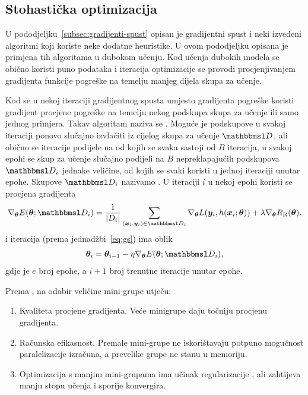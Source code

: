 \documentclass[utf8, diplomski, lmodern]{fer}
\begin{document}
\subsection{Stohastička optimizacija} \label{subsec:dukn-stoh-optimizacija}

U pododjeljku~\ref{subsec:gradijenti-spust} opisan je gradijentni spust i neki izvedeni algoritmi koji koriste neke dodatne heuristike. U ovom pododjeljku opisana je primjena tih algoritama u dubokom učenju. Kod učenja dubokih modela se obično koristi puno podataka i iteracija optimizacije se provodi procjenjivanjem gradijenta funkcije pogreške na temelju manjeg dijela skupa za učenje.

Kod  se u nekoj iteraciji gradijentnog spusta umjesto gradijenta pogreške koristi gradijent procjene pogreške na temelju nekog podskupa skupa za učenje ili samo jednog primjera. Takav algoritam naziva se . Moguće je podskupove u svakoj iteraciji ponovo slučajno izvlačiti iz cijelog skupa za učenje $\set D$, ali obično se iteracije podijele na  od kojih se svaka sastoji od $B$ iteracija, u svakoj epohi se skup za učenje slučajno podijeli na $B$ nepreklapajućih podskupova $\set D_i$ jednake veličine, od kojih se svaki koristi u jednoj iteraciji unutar epohe. Skupove $\set D_i$ nazivamo . U iteraciji $i$ u nekoj epohi koristi se procjena gradijenta
\begin{align} \label{eq:sgs-ucenje}
\nabla_{\vec\theta}E(\vec\theta;\set D_i) = \frac{1}{\envert{D_i}}\sum_{(\vec x_i,\vec y_i)\in\set D_i} \nabla_{\vec\theta}L(\vec y_i,h(\vec x_i;\vec\theta)) + \lambda \nabla_{\vec\theta}R_\text{R}(\vec\theta) \text{.}
\end{align}
i iteracija (prema jednadžbi~\eqref{eq:gs}) ima oblik
\begin{align} \label{eq:sgs}
\vec \theta_i = \vec \theta_{i-1} - \eta\nabla_{\vec\theta}E(\vec\theta;\set D_{i})\text{,}
\end{align}
gdje je $e$ broj epohe, a $i+1$ broj trenutne iteracije unutar epohe.

Prema \citet{Goodfellow:2016:DL}, na odabir veličine mini-grupe utječu:
\begin{enumerate}[topsep=0pt,itemsep=0pt,partopsep=0pt]
	\item Kvaliteta procjene gradijenta. Veće minigrupe daju točniju procjenu gradijenta.
	\item Računska efikasnost. Premale mini-grupe ne iskorištavaju potpuno mogućnost paralelizacije izračuna, a prevelike grupe ne stanu u memoriju.
	\item Optimizacija s manjim mini-grupama ima učinak regularizacije \citep{Wilson:2003:GIBTGDL}, ali zahtijeva manju stopu učenja i sporije konvergira.
\end{enumerate}
\end{document}
